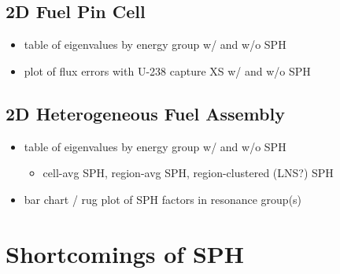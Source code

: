 \subsection{2D Fuel Pin Cell}
\label{subsubsec:chap5-sph-pin}

\begin{itemize}[noitemsep]
  \item table of eigenvalues by energy group w/ and w/o SPH
  \item plot of flux errors with U-238 capture XS w/ and w/o SPH
\end{itemize}

\subsection{2D Heterogeneous Fuel Assembly}
\label{subsec:chap5-sph-hetero-lat}

\begin{itemize}[noitemsep]
  \item table of eigenvalues by energy group w/ and w/o SPH
  \begin{itemize}[noitemsep]
    \item cell-avg SPH, region-avg SPH, region-clustered (LNS?) SPH
  \end{itemize}
  \item bar chart / rug plot of SPH factors in resonance group(s)
\end{itemize}

\section{Shortcomings of SPH}
\label{subsec:chap5-sph-shortcomings}
